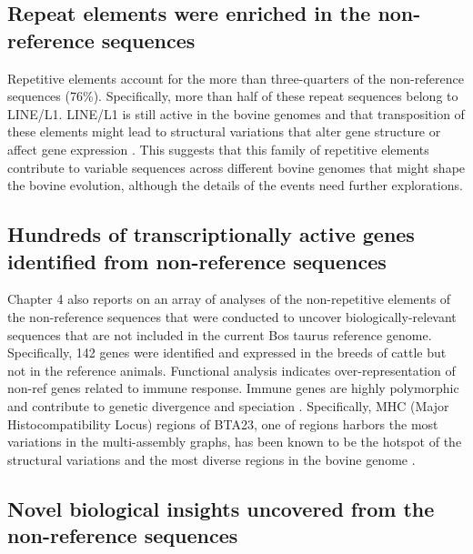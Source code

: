 \documentclass[../main.tex]{subfiles}
\begin{document}
\subsection*{Repeat elements were enriched in the non-reference sequences}

Repetitive elements account for the more than three-quarters of the non-reference sequences (76\%). Specifically, more than half of these repeat sequences belong to LINE/L1. LINE/L1 is still active in the bovine genomes and that transposition of these elements might lead to structural variations that alter gene structure or affect gene expression \citep{adelson2009characterization,beck2011line,chen2017detection}. This suggests that this family of repetitive elements contribute to variable sequences across different bovine genomes that might shape the bovine evolution, although the details of the events need further explorations.

\subsection*{Hundreds of transcriptionally active genes identified from non-reference sequences}

Chapter 4 also reports on an array of analyses of the non-repetitive elements of the non-reference sequences that were conducted to uncover biologically-relevant sequences that are not included in the current Bos taurus reference genome. Specifically, 142 genes were identified and expressed in the breeds of cattle but not in the reference animals. Functional analysis indicates over-representation of non-ref genes related to immune response. Immune genes are highly polymorphic and contribute to genetic divergence and speciation \citep{chen2019large}. Specifically, MHC (Major Histocompatibility Locus) regions of BTA23, one of regions harbors the most variations in the multi-assembly graphs, has been known to be the hotspot of the structural variations and the most diverse regions in the bovine genome \citep{Hu2020}. 

\subsection*{Novel biological insights uncovered from the non-reference sequences}
\end{document}

